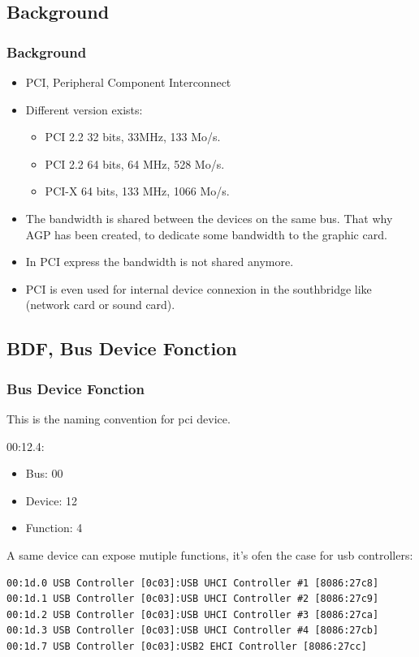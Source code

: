 \subsection*{Background}
\begin{frame}
\frametitle{Background}
\begin{itemize}
\item PCI, Peripheral Component Interconnect
\item Different version exists:
\begin{itemize}
\item PCI 2.2 32 bits, 33MHz, 133 Mo/s.
\item PCI 2.2 64 bits, 64 MHz, 528 Mo/s.
\item PCI-X 64 bits, 133 MHz, 1066 Mo/s.
\end{itemize}
\item The bandwidth is shared between the devices on the same bus. That
why AGP has been created, to dedicate some bandwidth to the graphic
card.
\item In PCI express the bandwidth is not shared anymore. 
\item PCI is even used for internal device connexion in the southbridge
like (network card or sound card).
\end{itemize}
\end{frame}

\subsection{BDF, Bus Device Fonction}
\begin{frame}[fragile]
\frametitle{Bus Device Fonction}
This is the naming convention for pci device.

\-

00:12.4:
\begin{itemize}
\item Bus: 00
\item Device: 12
\item Function: 4
\end{itemize}

\-

A same device can expose mutiple functions, it's ofen the case for usb
controllers:

\begin{verbatim}
00:1d.0 USB Controller [0c03]:USB UHCI Controller #1 [8086:27c8]
00:1d.1 USB Controller [0c03]:USB UHCI Controller #2 [8086:27c9]
00:1d.2 USB Controller [0c03]:USB UHCI Controller #3 [8086:27ca]
00:1d.3 USB Controller [0c03]:USB UHCI Controller #4 [8086:27cb]
00:1d.7 USB Controller [0c03]:USB2 EHCI Controller [8086:27cc]
\end{verbatim}

\end{frame}

